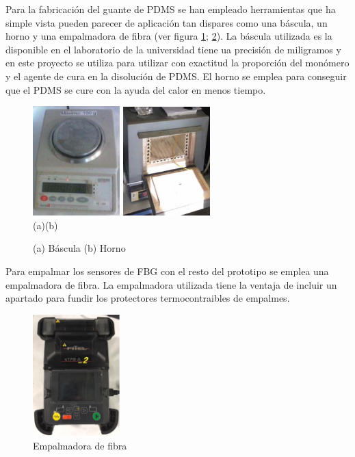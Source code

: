 Para la fabricación del guante de PDMS se han empleado herramientas que ha simple vista pueden parecer de aplicación tan dispares como una báscula, un horno y una empalmadora de fibra (ver figura \ref{fig:herramientas}; \ref{fig:empalmadora}). La báscula utilizada es la disponible en el laboratorio de la universidad tiene ua precisión de miligramos y en este proyecto se utiliza para utilizar con exactitud la proporción del monómero y el agente de cura en la disolución de PDMS. El horno se emplea para conseguir que el PDMS se cure con la ayuda del calor en menos tiempo.

\begin{figure}[H]
	\centering
	\includegraphics[width=0.3\textwidth]{./img/bascula}
	\includegraphics[width=0.3\textwidth]{./img/horno} 
	\\(a)\hspace{4cm}(b)
	\caption{(a) Báscula (b) Horno } 
	\label{fig:herramientas}
\end{figure}

Para empalmar los sensores de FBG con el resto del prototipo se emplea una empalmadora de fibra. La empalmadora utilizada tiene la ventaja de incluir un apartado para fundir los protectores termocontraibles de empalmes. 

\begin{figure}[H]
	\centering
	\includegraphics[width=0.3\textwidth]{./img/empalmadora}
	\caption{Empalmadora de fibra} \label{fig:empalmadora}
\end{figure}


